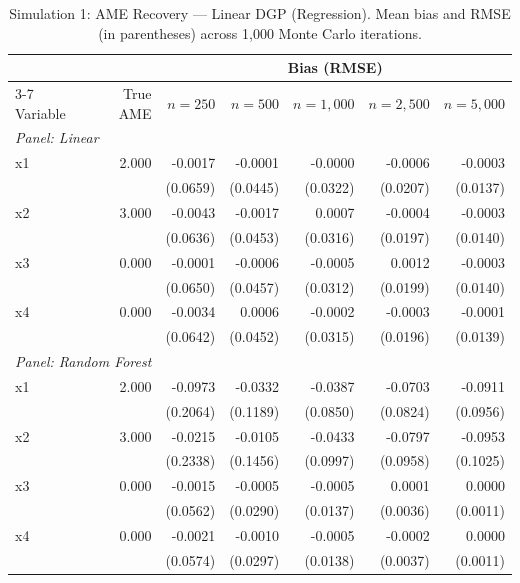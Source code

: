 \documentclass[12pt,a4paper]{article}
\numberwithin{equation}{section}
\theoremstyle{plain}
\theoremstyle{definition}
\begin{document}
	\begin{table}[htbp]
		\centering
		\small
		\begin{threeparttable}
			\caption{Simulation 1: AME Recovery --- Linear DGP (Regression). Mean bias and RMSE (in parentheses) across 1,000 Monte Carlo iterations.}
			\label{tab:sim1_regression_linear}
			\begin{tabular}{lrrrrrr}
				\toprule
				& & \multicolumn{5}{c}{Bias (RMSE)} \\
				\cmidrule(lr){3-7}
				Variable & True AME & $n=250$ & $n=500$ & $n=1,000$ & $n=2,500$ & $n=5,000$ \\
				\midrule
				\multicolumn{7}{l}{\textit{Panel: Linear}} \\
				\quad x1 & 2.000 & -0.0017 & -0.0001 & -0.0000 & -0.0006 & -0.0003 \\
				&  & (0.0659) & (0.0445) & (0.0322) & (0.0207) & (0.0137) \\
				\quad x2 & 3.000 & -0.0043 & -0.0017 & 0.0007 & -0.0004 & -0.0003 \\
				&  & (0.0636) & (0.0453) & (0.0316) & (0.0197) & (0.0140) \\
				\quad x3 & 0.000 & -0.0001 & -0.0006 & -0.0005 & 0.0012 & -0.0003 \\
				&  & (0.0650) & (0.0457) & (0.0312) & (0.0199) & (0.0140) \\
				\quad x4 & 0.000 & -0.0034 & 0.0006 & -0.0002 & -0.0003 & -0.0001 \\
				&  & (0.0642) & (0.0452) & (0.0315) & (0.0196) & (0.0139) \\
				\midrule
				\multicolumn{7}{l}{\textit{Panel: Random Forest}} \\
				\quad x1 & 2.000 & -0.0973 & -0.0332 & -0.0387 & -0.0703 & -0.0911 \\
				&  & (0.2064) & (0.1189) & (0.0850) & (0.0824) & (0.0956) \\
				\quad x2 & 3.000 & -0.0215 & -0.0105 & -0.0433 & -0.0797 & -0.0953 \\
				&  & (0.2338) & (0.1456) & (0.0997) & (0.0958) & (0.1025) \\
				\quad x3 & 0.000 & -0.0015 & -0.0005 & -0.0005 & 0.0001 & 0.0000 \\
				&  & (0.0562) & (0.0290) & (0.0137) & (0.0036) & (0.0011) \\
				\quad x4 & 0.000 & -0.0021 & -0.0010 & -0.0005 & -0.0002 & 0.0000 \\
				&  & (0.0574) & (0.0297) & (0.0138) & (0.0037) & (0.0011) \\
				\midrule

\end{tabular}
\end{threeparttable}
\end{table}
\end{document}

